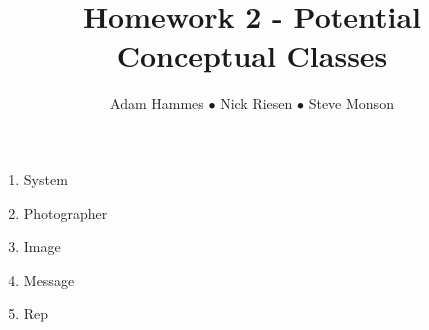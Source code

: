 \documentclass{article}
\title{Homework 2 - Potential Conceptual Classes}
\author{Adam Hammes $\bullet$ Nick Riesen $\bullet$ Steve Monson}
\begin{document}
\maketitle

\begin{enumerate}
    \item System
    \item Photographer
    \item Image
    \item Message
    \item Rep
\end{enumerate}
\end{document}
